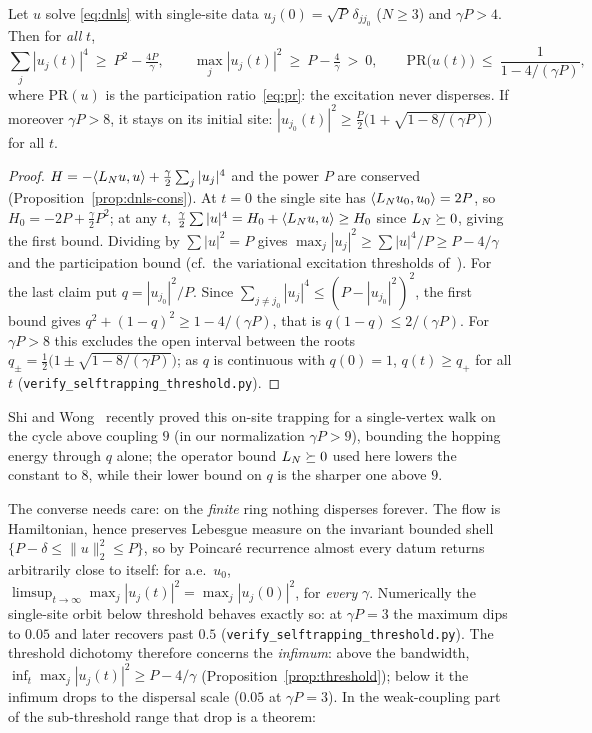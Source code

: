 \begin{proposition}\label{prop:threshold}
Let $u$ solve \eqref{eq:dnls} with single-site data $u_j(0)=\sqrt P\,\delta_{jj_0}$ ($N\ge3$) and
$\gamma P>4$. Then for \emph{all} $t$,
\[
  \sum_j|u_j(t)|^4\ \ge\ P^2-\tfrac{4P}\gamma,\qquad
  \max_j|u_j(t)|^2\ \ge\ P-\tfrac4\gamma\ >\ 0,\qquad
  \mathrm{PR}\bigl(u(t)\bigr)\ \le\ \frac1{1-4/(\gamma P)},
\]
where $\mathrm{PR}(u)$ is the participation ratio~\eqref{eq:pr}: the excitation never disperses. If moreover
$\gamma P>8$, it stays on its initial site: $|u_{j_0}(t)|^2\ge\tfrac P2\bigl(1+\sqrt{1-8/(\gamma P)}\bigr)$ for
all $t$.
\end{proposition}

\begin{proof}
$H=-\langle L_N u,u\rangle+\tfrac\gamma2\sum_j|u_j|^4$ and the power $P$ are conserved
(Proposition~\ref{prop:dnls-cons}). At $t=0$ the single site has $\langle L_N u_0,u_0\rangle=2P$, so
$H_0=-2P+\tfrac\gamma2P^2$; at any $t$, $\tfrac\gamma2\sum|u|^4=H_0+\langle L_N u,u\rangle\ge H_0$ since
$L_N\succeq0$, giving the first bound. Dividing by $\sum|u|^2=P$ gives
$\max_j|u_j|^2\ge\sum|u|^4/P\ge P-4/\gamma$ and the participation bound (cf.\ the variational excitation
thresholds of~\cite{Weinstein99}). For the last claim put $q=|u_{j_0}|^2/P$. Since
$\sum_{j\ne j_0}|u_j|^4\le(P-|u_{j_0}|^2)^2$, the first bound gives $q^2+(1-q)^2\ge1-4/(\gamma P)$, that is
$q(1-q)\le2/(\gamma P)$. For $\gamma P>8$ this excludes the open interval between the roots
$q_\pm=\frac12\bigl(1\pm\sqrt{1-8/(\gamma P)}\bigr)$; as $q$ is continuous with $q(0)=1$, $q(t)\ge q_+$ for all
$t$ (\texttt{verify\_selftrapping\_threshold.py}). \end{proof}

\noindent Shi and Wong~\cite{ShiWong} recently proved this on-site trapping for a single-vertex walk on the
cycle above coupling $9$ (in our normalization $\gamma P>9$), bounding the hopping energy through $q$ alone;
the operator bound $L_N\succeq0$ used here lowers the constant to $8$, while their lower bound on $q$ is the
sharper one above $9$.

\noindent The converse needs care: on the \emph{finite} ring nothing disperses forever. The flow is
Hamiltonian, hence preserves Lebesgue measure on the invariant bounded shell
$\{P-\delta\le\|u\|_2^2\le P\}$, so by Poincar\'e recurrence almost every datum returns arbitrarily close
to itself: for a.e.\ $u_0$, $\limsup_{t\to\infty}\max_j|u_j(t)|^2=\max_j|u_j(0)|^2$, for \emph{every}
$\gamma$. Numerically the single-site orbit below threshold behaves exactly so: at $\gamma P=3$ the maximum
dips to $0.05$ and later recovers past $0.5$ (\texttt{verify\_selftrapping\_threshold.py}). The threshold
dichotomy therefore concerns the \emph{infimum}: above the bandwidth,
$\inf_t\max_j|u_j(t)|^2\ge P-4/\gamma$ (Proposition~\ref{prop:threshold}); below it the infimum drops to
the dispersal scale ($0.05$ at $\gamma P=3$). In the weak-coupling part of the sub-threshold range that
drop is a theorem:


